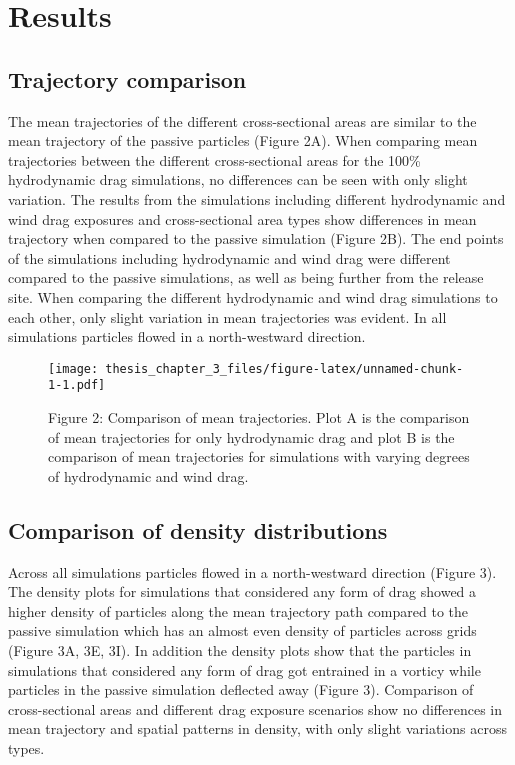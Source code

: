 \documentclass[
]{article}
\begin{document}
\hypertarget{results}{%
\section{Results}\label{results}}

\hypertarget{trajectory-comparison}{%
\subsection{Trajectory comparison}\label{trajectory-comparison}}

The mean trajectories of the different cross-sectional areas are similar
to the mean trajectory of the passive particles (Figure 2A). When
comparing mean trajectories between the different cross-sectional areas
for the 100\% hydrodynamic drag simulations, no differences can be seen
with only slight variation. The results from the simulations including
different hydrodynamic and wind drag exposures and cross-sectional area
types show differences in mean trajectory when compared to the passive
simulation (Figure 2B). The end points of the simulations including
hydrodynamic and wind drag were different compared to the passive
simulations, as well as being further from the release site. When
comparing the different hydrodynamic and wind drag simulations to each
other, only slight variation in mean trajectories was evident. In all
simulations particles flowed in a north-westward direction.

\begin{figure}
\centering
\texttt{[image: thesis\_chapter\_3\_files/figure-latex/unnamed-chunk-1-1.pdf]}
\caption{Figure 2: Comparison of mean trajectories. Plot A is the
comparison of mean trajectories for only hydrodynamic drag and plot B is
the comparison of mean trajectories for simulations with varying degrees
of hydrodynamic and wind drag.}
\end{figure}

\hypertarget{comparison-of-density-distributions}{%
\subsection{Comparison of density
distributions}\label{comparison-of-density-distributions}}

Across all simulations particles flowed in a north-westward direction
(Figure 3). The density plots for simulations that considered any form
of drag showed a higher density of particles along the mean trajectory
path compared to the passive simulation which has an almost even density
of particles across grids (Figure 3A, 3E, 3I). In addition the density
plots show that the particles in simulations that considered any form of
drag got entrained in a vorticy while particles in the passive
simulation deflected away (Figure 3). Comparison of cross-sectional
areas and different drag exposure scenarios show no differences in mean
trajectory and spatial patterns in density, with only slight variations
across types.
\end{document}
